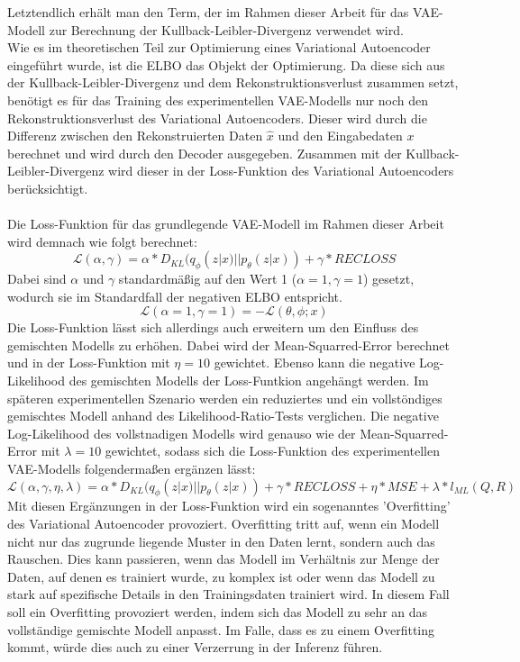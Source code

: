 \documentclass[%
thesis=student,%
coverpage=false,%
titlepage=false,%
headmarks=true, %
german,%
font=libertine, %
math=newpxtx, %
BCOR=5mm,%
coverBCOR=11mm%
]{tumbook}
\theoremstyle{break}
\begin{document}
Letztendlich erhält man den Term, der im Rahmen dieser Arbeit für das VAE-Modell zur Berechnung der Kullback-Leibler-Divergenz verwendet wird.\\
Wie es im theoretischen Teil zur Optimierung eines Variational Autoencoder eingeführt wurde, ist die ELBO das Objekt der Optimierung. Da diese sich aus der Kullback-Leibler-Divergenz und dem Rekonstruktionsverlust zusammen setzt, benötigt es für das Training des experimentellen VAE-Modells nur noch den Rekonstruktionsverlust des Variational Autoencoders.
Dieser wird durch die Differenz zwischen den Rekonstruierten Daten $\hat{x}$ und den Eingabedaten $x$ berechnet und wird durch den Decoder ausgegeben. Zusammen mit der Kullback-Leibler-Divergenz wird dieser in der Loss-Funktion des Variational Autoencoders berücksichtigt.\\
\\
Die Loss-Funktion für das grundlegende VAE-Modell im Rahmen dieser Arbeit wird demnach wie folgt berechnet:\\
$$ \mathcal{L}(\alpha, \gamma) = \alpha * D_{KL}(q_\phi(z|x)||p_\theta(z|x)) + \gamma * RECLOSS $$
Dabei sind $\alpha$ und $\gamma$ standardmäßig auf den Wert 1 ($\alpha=1, \gamma=1$) gesetzt, wodurch sie im Standardfall der negativen ELBO entspricht.
$$ \mathcal{L}(\alpha=1, \gamma=1) = - \mathcal{L}(\theta,\phi;x) $$
Die Loss-Funktion lässt sich allerdings auch erweitern um den Einfluss des gemischten Modells zu erhöhen. Dabei wird der Mean-Squarred-Error berechnet und in der Loss-Funktion mit $\eta = 10$ gewichtet. Ebenso kann die negative Log-Likelihood des gemischten Modells der Loss-Funtkion angehängt werden. Im späteren experimentellen Szenario werden ein reduziertes und ein vollstöndiges gemischtes Modell anhand des Likelihood-Ratio-Tests verglichen. Die negative Log-Likelihood des vollstnadigen Modells wird genauso wie der Mean-Squarred-Error mit $\lambda = 10$ gewichtet, sodass sich die Loss-Funktion des experimentellen VAE-Modells folgendermaßen ergänzen lässt:
$$ \mathcal{L}(\alpha,\gamma,\eta,\lambda) = \alpha * D_{KL}(q_\phi(z|x)||p_\theta(z|x)) + \gamma * RECLOSS + \eta * MSE + \lambda * l_{ML}(Q,R)$$
Mit diesen Ergänzungen in der Loss-Funktion wird ein sogenanntes 'Overfitting' des Variational Autoencoder provoziert. Overfitting tritt auf, wenn ein Modell nicht nur das zugrunde liegende Muster in den Daten lernt, sondern auch das Rauschen. Dies kann passieren, wenn das Modell im Verhältnis zur Menge der Daten, auf denen es trainiert wurde, zu komplex ist oder wenn das Modell zu stark auf spezifische Details in den Trainingsdaten trainiert wird. In diesem Fall soll ein Overfitting provoziert werden, indem sich das Modell zu sehr an das vollständige gemischte Modell anpasst. Im Falle, dass es zu einem Overfitting kommt, würde dies auch zu einer Verzerrung in der Inferenz führen.
\end{document}

